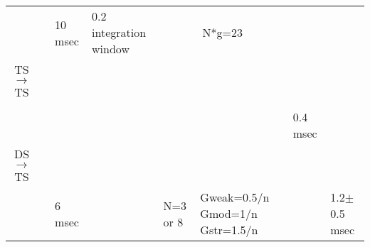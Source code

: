 \begin{longtable}{cXXXXXXX}
                                 &             \citep{ReissYoung:2005}              &                                                      10 msec                                                       &                  0.2 integration window                   &                                                       \multicolumn{2}{c}{N*g=23}                                                        &                                           & \\ 
  TS\ensuremath{\rightarrow}TS   &                                                  &                                                                                                                    &                                                           &                                           &                                                                                             &                                           & \\\midrule
                                 &           \citep{WiegrebeMeddis:2004}            &                                                                                                                    &                                                           &                                           &                                                                                             & \\ 
                                 &  \citep{BahmerLangner:2006,BahmerLangner:2006a}  &                                                                                                                    &                                                           &                                           &                                                                                             & 0.4 msec\\
  DS\ensuremath{\rightarrow}TS   &                                                  &                                                                                                                    &                                                           &                                           &                                                                                             &                                           & \\\midrule
                                 &           \citep{ErikssonRobert:1999}            &                                                       6 msec                                                       &                                                           &                 N=3 or 8                  &                               Gweak=0.5/n Gmod=1/n Gstr=1.5/n                               &                                           & 1.2$\pm$0.5 msec \\ 

\end{longtable}
